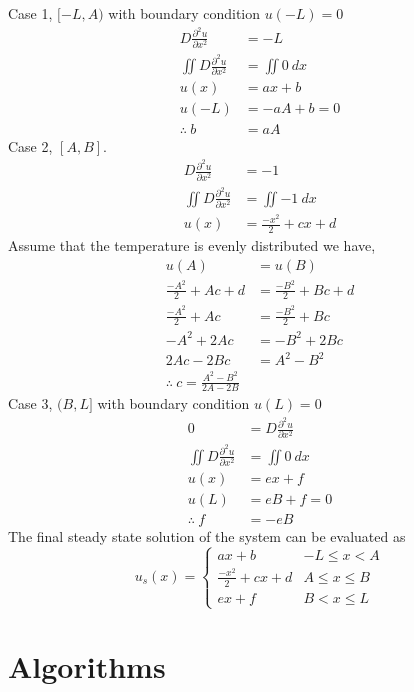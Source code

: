 \documentclass{article}
\begin{document}
\noindent Case 1, $[-L,A)$ with boundary condition $u(-L) = 0$
\[
	\begin{split}
		D\frac{\partial^2 u}{\partial x^2} &= -L \\
		\iint D\frac{\partial^2 u}{\partial x^2} &= \iint 0 \ dx \\
		u(x) &= ax + b \\
		u(-L) &= -aA + b = 0\\
		\therefore \ b &= aA
	\end{split}
\]
Case 2, $[A,B]$.
\[
	\begin{split}
		D\frac{\partial^2 u}{\partial x^2} &= -1 \\
		\iint D\frac{\partial^2 u}{\partial x^2} &= \iint -1 \ dx \\
		u(x) &= \frac{-x^2}{2} + cx + d
	\end{split}
\]
Assume that the temperature is evenly distributed we have,
\[
	\begin{split}
		u(A) &= u(B) \\
		\frac{-A^2}{2} + Ac + d &= \frac{-B^2}{2} + Bc + d \\
		\frac{-A^2}{2} + Ac &= \frac{-B^2}{2} + Bc \\
		-A^2 + 2Ac &= -B^2 + 2Bc \\
		2Ac - 2Bc &= A^2 - B^2 \\
		\therefore \ c = \frac{A^2 - B^2}{2A - 2B}
	\end{split}
\]
Case 3, $(B,L]$ with boundary condition $u(L) = 0$
\[
	\begin{split}
		0 &= D\frac{\partial^2 u}{\partial x^2} \\
		\iint D\frac{\partial^2 u}{\partial x^2} &= \iint 0 \ dx \\
		u(x) &= ex + f \\
		u(L) &= eB + f = 0\\
		\therefore \ f &= -eB
	\end{split}
\]
The final steady state solution of the system can be evaluated as
\[ u_s(x) = \begin{cases} 
      ax + b & -L \leq x < A \\
      \frac{-x^2}{2} + cx + d & A \leq x\leq B \\
      ex + f & B < x \leq L
   \end{cases}
\]
\newpage
\section{Algorithms}
\end{document}
